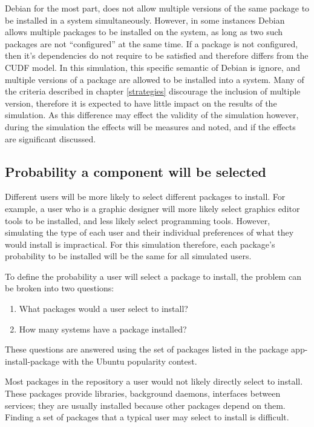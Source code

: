 Debian for the most part, does not allow multiple versions of the same package to be installed in a system simultaneously.
However, in some instances Debian allows multiple packages to be installed on the system, as long as two such packages are not ``configured'' at the same time.
If a package is not configured, then it's dependencies do not require to be satisfied and therefore differs from the CUDF model.
In this simulation, this specific semantic of Debian is ignore, and multiple versions of a package are allowed to be installed into a system.
Many of the criteria described in chapter \ref{strategies} discourage the inclusion of multiple version,
therefore it is expected to have little impact on the results of the simulation.
As this difference may effect the validity of the simulation however, during the simulation the effects will be measures and noted, and if the effects are significant discussed.


\subsection{Probability a component will be selected}
Different users will be more likely to select different packages to install.
For example, a user who is a graphic designer will more likely select graphics editor tools to be installed, and less likely select programming tools.
However, simulating the type of each user and their individual preferences of what they would install is impractical.
For this simulation therefore, each package's probability to be installed will be the same for all simulated users.

To define the probability a user will select a package to install, the problem can be broken into two questions:
\begin{enumerate}
  \item What packages would a user select to install?
  \item How many systems have a package installed?
\end{enumerate}
These questions are answered using the set of packages listed in the package app-install-package with the Ubuntu popularity contest.

Most packages in the repository a user would not likely directly select to install.
These packages provide libraries, background daemons, interfaces between services; they are usually installed because other packages depend on them.
Finding a set of packages that a typical user may select to install is difficult.

